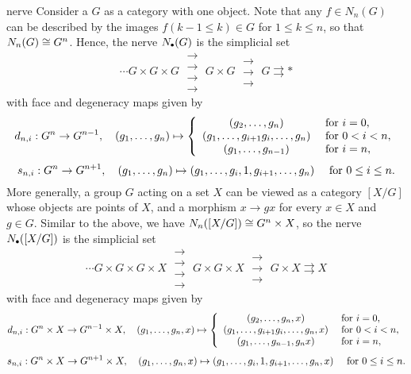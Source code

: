 \begin{example}{nerve}
    Consider a  $G$ as a category with one object. Note that any $f \in N_n(G)$ can be described by the images $f(k - 1 \le k) \in G$ for $1 \le k \le n$, so that $N_n(G) \cong G^n$. Hence, the nerve $N_\bdot(G)$ is the simplicial set
    \[ \cdots G \times G \times G \; \substack{\rightarrow \\[-0.9em] \rightarrow \\[-0.9em] \rightarrow \\[-0.9em] \rightarrow} \; G \times G \; \substack{\rightarrow \\[-0.9em] \rightarrow \\[-0.9em] \rightarrow} \; G \rightrightarrows * \]
    with face and degeneracy maps given by
    \[ d_{n, i} : G^n \to G^{n - 1}, \quad (g_1, \ldots, g_n) \mapsto \left\{ \begin{array}{cl}
        (g_2, \ldots, g_n) & \textup{ for } i = 0, \\
        (g_1, \ldots, g_{i + 1} g_i, \ldots, g_n) & \textup{ for } 0 < i < n, \\
        (g_1, \ldots, g_{n - 1}) & \textup{ for } i = n,
    \end{array} \right. \]
    \[ s_{n, i} : G^n \to G^{n + 1}, \quad (g_1, \ldots, g_n) \mapsto (g_1, \ldots, g_i, 1, g_{i + 1}, \ldots, g_n) \quad \textup{ for } 0 \le i \le n . \]
    More generally, a group $G$ acting on a set $X$ can be viewed as a category $[X/G]$ whose objects are points of $X$, and a morphism $x \to gx$ for every $x \in X$ and $g \in G$. Similar to the above, we have $N_n([X/G]) \cong G^n \times X$, so the nerve $N_\bdot([X/G])$ is the simplicial set
    \[ \cdots G \times G \times G \times X \; \substack{\rightarrow \\[-0.9em] \rightarrow \\[-0.9em] \rightarrow \\[-0.9em] \rightarrow} \; G \times G \times X \; \substack{\rightarrow \\[-0.9em] \rightarrow \\[-0.9em] \rightarrow} \; G \times X \rightrightarrows X \]
    with face and degeneracy maps given by
    \[ d_{n, i} : G^n \times X \to G^{n - 1} \times X, \quad (g_1, \ldots, g_n, x) \mapsto \left\{ \begin{array}{cl}
        (g_2, \ldots, g_n, x) & \textup{ for } i = 0, \\
        (g_1, \ldots, g_{i + 1} g_i, \ldots, g_n, x) & \textup{ for } 0 < i < n, \\
        (g_1, \ldots, g_{n - 1}, g_n x) & \textup{ for } i = n,
    \end{array} \right. \]
    \[ s_{n, i} : G^n \times X \to G^{n + 1} \times X, \quad (g_1, \ldots, g_n, x) \mapsto (g_1, \ldots, g_i, 1, g_{i + 1}, \ldots, g_n, x) \quad \textup{ for } 0 \le i \le n . \]
\end{example}

